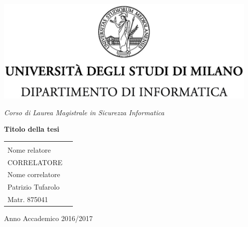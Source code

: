 \begin{titlepage}
  \begin{center}
    \includegraphics[height=5.0cm]{immagini/unimi.jpg}
    
    \vspace*{.4cm}
    {\Large 
      \emph{Corso di Laurea Magistrale in Sicurezza Informatica}
    }
    \vfill
    \begin{LARGE}
      \textbf{Titolo della tesi}
    \end{LARGE}
    
    \vfill
    \begin{minipage}{\linewidth}
      \begin{tabular}{l r}
        \begin{minipage}{.45\linewidth}
          \begin{flushleft}
            {\large
              RELATORE\\[.2cm]
              Nome relatore \\[.6cm]
              CORRELATORE\\[.2cm]
              Nome correlatore
            }

          \end{flushleft}
        \end{minipage}
        &
        \begin{minipage}{.45\linewidth}
          \begin{flushright}
            {\large
              TESI DI LAUREA DI\\[.3cm]
              Patrizio Tufarolo\\[.45cm]
              Matr. 875041
            }
          \end{flushright}
        \end{minipage}
      \end{tabular}
    \end{minipage}
    
    \vfill
    {\large{{Anno Accademico 2016/2017}}}
  \end{center}
\end{titlepage}



